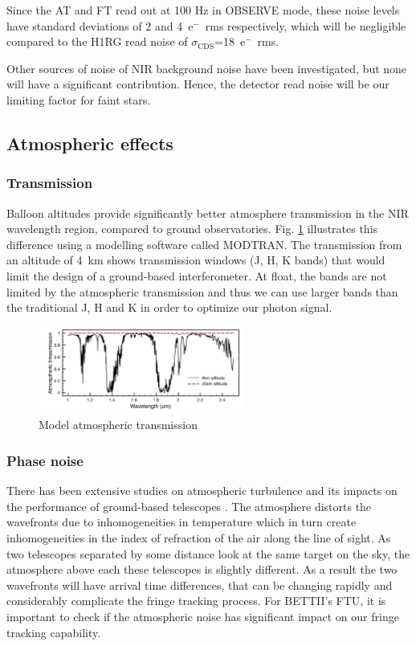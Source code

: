 Since the AT and FT read out at 100 Hz in OBSERVE mode, these noise levels have standard deviations of 2 and 4~e$^{-}$~rms respectively, which will be negligible compared to the H1RG read noise of $\sigma_\textrm{CDS}$=18~e$^{-}$~rms. 

Other sources of noise of NIR background noise have been investigated, but none will have a significant contribution. Hence, the detector read noise will be our limiting factor for faint stars.

\subsection{Atmospheric effects}

\subsubsection{Transmission}
Balloon altitudes provide significantly better atmosphere transmission in the NIR wavelength region, compared to ground observatories. Fig. \ref{fig:trans} illustrates this difference using a modelling software called MODTRAN. The transmission from an altitude of 4~km shows transmission windows (J, H, K bands) that would limit the design of a ground-based interferometer. At float, the bands are not limited by the atmospheric transmission and thus we can use larger bands than the traditional J, H and K in order to optimize our photon signal.

\begin{figure}[ht!]
\begin{center}
\includegraphics[width=0.6\textwidth]{Figures/trans.pdf}
\caption{Model atmospheric transmission}
\label{fig:trans}
\end{center}
\end{figure}

\subsubsection{Phase noise}

There has been extensive studies on atmospheric turbulence and its impacts on the performance of ground-based telescopes \citep[e.g.,][]{Hardy:1998ul}. The atmosphere distorts the wavefronts  due to inhomogeneities in temperature which in turn create inhomogeneities in the index of refraction of the air along the line of sight. As two telescopes separated by some distance look at the same target on the sky, the atmosphere above each these telescopes is slightly different. As a result the two wavefronts will have arrival time differences, that can be changing rapidly and considerably complicate the fringe tracking process. For BETTII's FTU, it is important to check if the atmospheric noise has significant impact on our fringe tracking capability.

